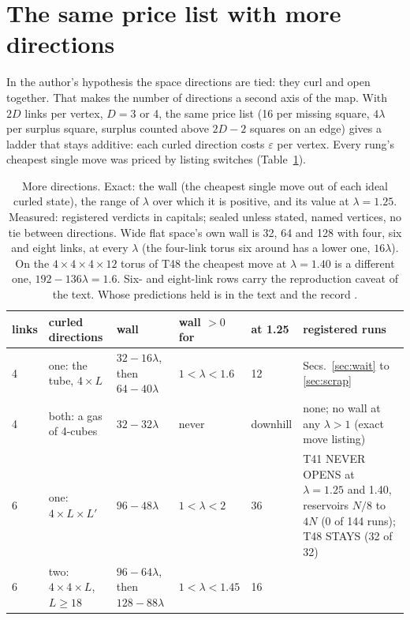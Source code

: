 \documentclass[aps,pre,10pt,twocolumn,superscriptaddress,nofootinbib]{revtex4-2}
\begin{document}
\section{The same price list with more directions}
\label{sec:directions}

In the author's hypothesis the space directions are tied: they curl and open together. That makes the number of
directions a second axis of the map. With $2D$ links per vertex, $D=3$ or 4, the same price list (16 per
missing square, $4\lambda$ per surplus square, surplus counted above $2D-2$ squares on an edge) gives a ladder that stays
additive: each curled direction costs $\varepsilon$ per vertex. Every rung's cheapest single move was priced by
listing switches (Table~\ref{tab:dmap}).

\begin{table}[t]
\caption{More directions. Exact: the wall (the cheapest single move out of each ideal curled state), the range
of $\lambda$ over which it is positive, and its value at $\lambda=1.25$. Measured: registered verdicts in
capitals; sealed unless stated, named vertices, no tie between directions. Wide flat space's own wall is 32, 64 and
128 with four, six and eight links, at every $\lambda$ (the four-link torus six around has a lower one, $16\lambda$). On the $4\times4\times4\times12$ torus of T48 the
cheapest move at $\lambda=1.40$ is a different one, $192-136\lambda=1.6$. Six- and eight-link rows carry the
reproduction caveat of the text. Whose predictions held is in the text and the record \cite{repo}.}
\label{tab:dmap}
\begin{ruledtabular}
\begin{tabular}{lp{3.2cm}p{2.3cm}p{1.9cm}p{1.35cm}p{6.6cm}}
links & curled directions & wall & wall $>0$ for & at 1.25 & registered runs \\
\hline
4 & one: the tube, $4\times L$ & $32-16\lambda$, then\newline $64-40\lambda$ & $1<\lambda<1.6$ & 12 &
Secs.~\ref{sec:wait} to \ref{sec:scrap} \\
4 & both: a gas of 4-cubes & $32-32\lambda$ & never & downhill &
none; no wall at any $\lambda>1$ (exact move listing) \\
6 & one: $4\times L\times L'$ & $96-48\lambda$ & $1<\lambda<2$ & 36 &
T41 NEVER OPENS at $\lambda=1.25$ and 1.40, reservoirs $N/8$ to $4N$ (0 of 144 runs); T48 STAYS (32 of 32) \\
6 & two: $4\times4\times L$, $L\ge18$ & $96-64\lambda$, then\newline $128-88\lambda$ & $1<\lambda<1.45$ & 16 &

\end{tabular}
\end{ruledtabular}
\end{table}
\end{document}
